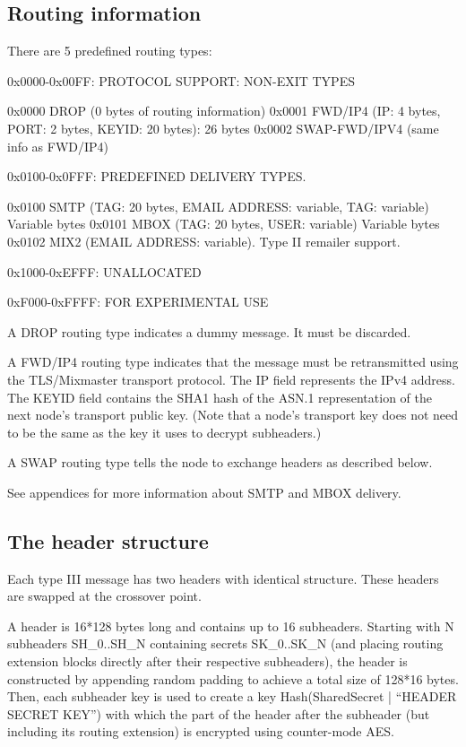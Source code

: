 \subsection{Routing information}

There are 5 predefined routing types:

0x0000-0x00FF: PROTOCOL SUPPORT: NON-EXIT TYPES

0x0000 DROP    (0 bytes of routing information)
0x0001 FWD/IP4 (IP: 4 bytes, PORT: 2 bytes, KEYID: 20 bytes): 26 bytes
0x0002 SWAP-FWD/IPV4 (same info as FWD/IP4)

0x0100-0x0FFF: PREDEFINED DELIVERY TYPES.

0x0100 SMTP   (TAG: 20 bytes, EMAIL ADDRESS: variable, TAG: variable) Variable bytes
0x0101 MBOX   (TAG: 20 bytes, USER: variable) Variable bytes
0x0102 MIX2   (EMAIL ADDRESS: variable).  Type II remailer support.

0x1000-0xEFFF: UNALLOCATED

0xF000-0xFFFF: FOR EXPERIMENTAL USE

A DROP routing type indicates a dummy message. It must be discarded.

A FWD/IP4 routing type indicates that the message must be
retransmitted using the TLS/Mixmaster transport protocol. The IP field
represents the IPv4 address.  The KEYID field contains the SHA1 hash
of the ASN.1 representation of the next node's transport public key.
(Note that a node's transport key does not need to be the same as the
key it uses to decrypt subheaders.)

A SWAP routing type tells the node to exchange headers as described below.

See appendices for more information about SMTP and MBOX delivery.

\subsection{The header structure}

Each type III message has two headers with identical structure. These
headers are swapped at the crossover point.

A header is 16*128 bytes long and contains up to 16
subheaders. Starting with N subheaders SH_0..SH_N containing secrets
SK_0..SK_N (and placing routing extension blocks directly after their
respective subheaders), the header is constructed by appending 
random padding to achieve a total size
of 128*16 bytes. Then, each subheader key is used to create a key
Hash(SharedSecret | ``HEADER SECRET KEY'') with which the part of the
header after the subheader (but including its routing extension) is
encrypted using counter-mode AES.

